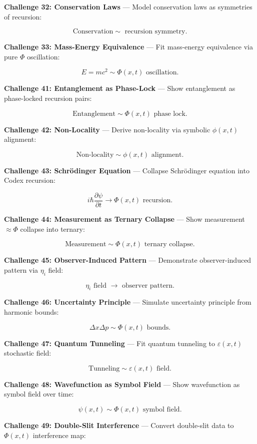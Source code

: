 \textbf{Challenge 32: Conservation Laws} --- Model conservation laws as symmetries of recursion:

$$
\text{Conservation} \sim \text{ recursion symmetry}.
$$

\textbf{Challenge 33: Mass-Energy Equivalence} --- Fit mass-energy equivalence via pure $\Phi$ oscillation:

$$
E = m c^2 \sim \Phi(x, t) \text{ oscillation}.
$$

\textbf{Challenge 41: Entanglement as Phase-Lock} --- Show entanglement as phase-locked recursion pairs:

$$
\text{Entanglement} \sim \Phi(x, t) \text{ phase lock}.
$$

\textbf{Challenge 42: Non-Locality} --- Derive non-locality via symbolic $\phi(x, t)$ alignment:

$$
\text{Non-locality} \sim \phi(x, t) \text{ alignment}.
$$

\textbf{Challenge 43: Schrödinger Equation} --- Collapse Schrödinger equation into Codex recursion:

$$
i \hbar \frac{\partial \psi}{\partial t} \rightarrow \Phi(x, t) \text{ recursion}.
$$

\textbf{Challenge 44: Measurement as Ternary Collapse} --- Show measurement $\approx \Phi$ collapse into ternary:

$$
\text{Measurement} \sim \Phi(x, t) \text{ ternary collapse}.
$$

\textbf{Challenge 45: Observer-Induced Pattern} --- Demonstrate observer-induced pattern via $\eta_i$ field:

$$
\eta_i \text{ field } \rightarrow \text{ observer pattern}.
$$

\textbf{Challenge 46: Uncertainty Principle} --- Simulate uncertainty principle from harmonic bounds:

$$
\Delta x \Delta p \sim \Phi(x, t) \text{ bounds}.
$$

\textbf{Challenge 47: Quantum Tunneling} --- Fit quantum tunneling to $\varepsilon(x, t)$ stochastic field:

$$
\text{Tunneling} \sim \varepsilon(x, t) \text{ field}.
$$

\textbf{Challenge 48: Wavefunction as Symbol Field} --- Show wavefunction as symbol field over time:

$$
\psi(x, t) \sim \Phi(x, t) \text{ symbol field}.
$$

\textbf{Challenge 49: Double-Slit Interference} --- Convert double-slit data to $\Phi(x, t)$ interference map:

